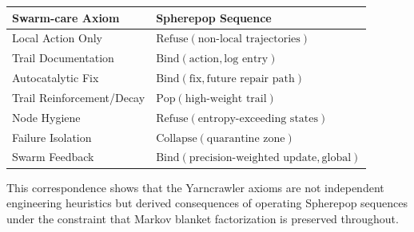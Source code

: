 \begin{center}
\begin{tabular}{ll}
\toprule
Swarm-care Axiom & Spherepop Sequence \\
\midrule
Local Action Only & $\mathrm{Refuse}(\text{non-local trajectories})$ \\
Trail Documentation & $\mathrm{Bind}(\text{action}, \text{log entry})$ \\
Autocatalytic Fix & $\mathrm{Bind}(\text{fix}, \text{future repair path})$ \\
Trail Reinforcement/Decay & $\mathrm{Pop}(\text{high-weight trail})$ \\
Node Hygiene & $\mathrm{Refuse}(\text{entropy-exceeding states})$ \\
Failure Isolation & $\mathrm{Collapse}(\text{quarantine zone})$ \\
Swarm Feedback & $\mathrm{Bind}(\text{precision-weighted update}, \text{global})$ \\
\bottomrule
\end{tabular}
\end{center}

This correspondence shows that the Yarncrawler axioms are not independent
engineering heuristics but derived consequences of operating Spherepop sequences
under the constraint that Markov blanket factorization is preserved throughout.
